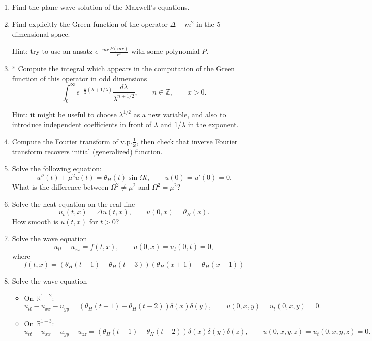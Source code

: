 \documentclass[a4paper,11pt]{article}
\begin{document}
\begin{enumerate}
\item\label{item:12} Find the plane wave solution of the Maxwell's equations.

\item\label{item:13} Find explicitly the Green function of the operator \(\Delta-m^2\) in the 5-dimensional space.

Hint: try to use an ansatz \(e^{-m r} \frac{P(mr)}{r^3}\) with some polynomial \(P\).

\item\label{item:14} * Compute the integral which appears in the computation of the Green function of this operator in odd dimensions
\[
\int_0^{\infty} e^{-\frac{x}{2}(\lambda+1/\lambda)}\frac{d\lambda}{\lambda^{n+1/2}},\qquad n\in \mathbb{Z}, \qquad x>0.
\]

Hint: it might be useful to choose \(\lambda^{1/2}\) as a new variable, and also to introduce independent coefficients in front of \(\lambda\) and \(1/\lambda\) in the exponent.

\item\label{item:15} Compute the Fourier transform of \(\mathrm{v.p.} \frac1{\omega}\), then check that inverse Fourier transform recovers initial (generalized) function.

\item\label{item:16} Solve the following equation:
\[
u''(t)+\mu^2u(t)=\theta_H(t)\sin\Omega t,\qquad u(0)=u'(0)=0.
\]
What is the difference between \(\Omega^2\neq \mu^2\) and \(\Omega^2=\mu^2\)?

\item\label{item:17} Solve the heat equation on the real line
\[
u_t(t,x)=\Delta u(t,x),\qquad u(0,x)=\theta_H(x).
\]
How smooth is \(u(t,x)\) for \(t>0\)?


\item\label{item:18} Solve the wave equation
\[
u_{tt}-u_{xx}=f(t,x), \qquad u(0,x)=u_t(0,t)=0,
\]
where
\[
f(t,x)=\left(\theta_H(t-1)-\theta_H(t-3)\right)\left(\theta_H(x+1)-\theta_H(x-1)\right)
\]

\item\label{item:19} Solve the wave equation

\begin{itemize}
\item
On \(\mathbb{R}^{1+2}\):
\[
u_{tt}-u_{xx}-u_{yy}=(\theta_H(t-1)-\theta_H(t-2))\delta(x)\delta(y),\qquad u(0,x,y)=u_t(0,x,y)=0.
\]
\item
On \(\mathbb{R}^{1+3}\):
\[
u_{tt}-u_{xx}-u_{yy}-u_{zz}=(\theta_H(t-1)-\theta_H(t-2))\delta(x)\delta(y)\delta(z), \qquad u(0,x,y,z)=u_t(0,x,y,z)=0.
\]
\end{itemize}


\end{enumerate}
\end{document}
